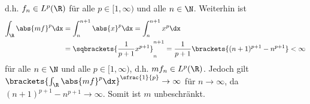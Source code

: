 \begin{exercisePage}
\begin{enumerate}[label=(zu \alph*), leftmargin=\zulength]
\begin{equation*}
		\end{equation*}
		d.h. $f_n \in L^p(\R)$ für alle $p \in [1,\infty)$ und alle $n \in \N$. Weiterhin ist
		\begin{equation*}
			\begin{aligned}
				\int_\R \abs{mf}^p \dx 
				&= \int_n^{n+1} \abs{x}^p \dx 
				= \int_n^{n+1} x^p \dx \\
				&= \sqbrackets{\frac{1}{p+1} x^{p+1}}_n^{n+1} 
				= \frac{1}{p+1} \brackets{(n+1)^{p+1} - n^{p+1}} < \infty
			\end{aligned}
		\end{equation*}
		für alle $n \in \N$ und alle $p \in [1,\infty)$, d.h. $mf_n \in L^p(\R)$. Jedoch gilt $\brackets{\int_\R \abs{mf}^p \dx}^{\sfrac{1}{p}} \to \infty$ für $n \to \infty$, da $(n+1)^{p+1} - n^{p+1} \to \infty$. Somit ist $m$ unbeschränkt.
	\end{enumerate}
\end{exercisePage}